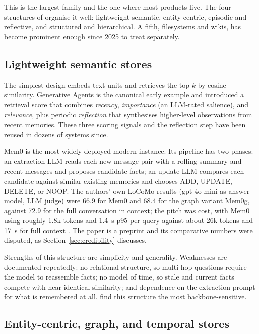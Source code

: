\documentclass[11pt]{article}
\begin{document}
This is the largest family and the one where most products live. The four structures of \citet{jiang2026anatomy} organise it well: lightweight semantic, entity-centric, episodic and reflective, and structured and hierarchical. A fifth, filesystems and wikis, has become prominent enough since 2025 to treat separately.

\subsection{Lightweight semantic stores}

The simplest design embeds text units and retrieves the top-$k$ by cosine similarity. Generative Agents \citep{park2023generative} is the canonical early example and introduced a retrieval score that combines \emph{recency}, \emph{importance} (an LLM-rated salience), and \emph{relevance}, plus periodic \emph{reflection} that synthesises higher-level observations from recent memories. These three scoring signals and the reflection step have been reused in dozens of systems since.

Mem0 \citep{chhikara2025mem0} is the most widely deployed modern instance. Its pipeline has two phases: an extraction LLM reads each new message pair with a rolling summary and recent messages and proposes candidate facts; an update LLM compares each candidate against similar existing memories and chooses ADD, UPDATE, DELETE, or NOOP. The authors' own LoCoMo results (gpt-4o-mini as answer model, LLM judge) were 66.9 for Mem0 and 68.4 for the graph variant Mem0g, against 72.9 for the full conversation in context; the pitch was cost, with Mem0 using roughly 1.8k tokens and 1.4~s p95 per query against about 26k tokens and 17~s for full context \citep{chhikara2025mem0,kumar2026agentmemory}. The paper is a preprint and its comparative numbers were disputed, as Section~\ref{sec:credibility} discusses.

Strengths of this structure are simplicity and generality. Weaknesses are documented repeatedly: no relational structure, so multi-hop questions require the model to reassemble facts; no model of time, so stale and current facts compete with near-identical similarity; and dependence on the extraction prompt for what is remembered at all. \citet{jiang2026anatomy} find this structure the most backbone-sensitive.

\subsection{Entity-centric, graph, and temporal stores}
\end{document}
